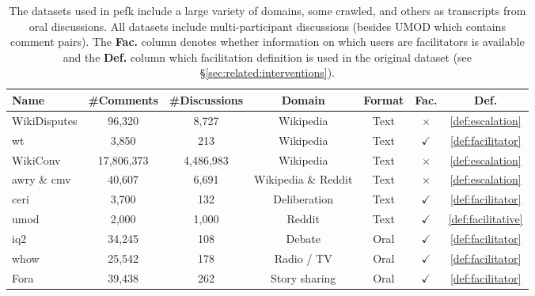 \documentclass[11pt]{article}
\theoremstyle{definition}
\theoremstyle{plain}
\begin{document}
\begin{table}[t]
	\centering
	\small
	\begin{tabularx}{\textwidth}{Xcccccc}
		\toprule
		\textbf{Name} & \textbf{\#Comments} & \textbf{\#Discussions} & \textbf{Domain} & \textbf{Format} & \textbf{Fac.} & \textbf{Def.} \\ \hline
		WikiDisputes \citeyearpar{wikidisputes} & 96,320 & 8,727 & Wikipedia & Text & $\times$ & \ref{def:escalation}\\ 
		\acf{wt} \citeyearpar{wikitactics} & 3,850 & 213 & Wikipedia & Text & $\checkmark$ & \ref{def:facilitator}\\ 
		WikiConv \citeyearpar{wikiconv} & 17,806,373 & 4,486,983 & Wikipedia & Text & $\times$ & \ref{def:escalation}\\ 
		\acf{awry} \& \acf{cmv} \citeyearpar{cmv_awry2} & 40,607 & 6,691 & Wikipedia \& Reddit & Text & $\times$ & \ref{def:escalation}\\
		\acf{ceri} \citeyearpar{ceri} & 3,700 & 132 & Deliberation & Text & $\checkmark$ & \ref{def:facilitator}\\ 
		\acf{umod} \citeyearpar{umod} & 2,000 & 1,000 & Reddit & Text& $\checkmark$ & \ref{def:facilitative}\\ 
		\acf{iq2} \citeyearpar{zhang-etal-2016-conversational} & 34,245 & 108 & Debate & Oral & $\checkmark$ & \ref{def:facilitator}\\ 
		\acf{whow} \citeyearpar{chen-etal-2025-whow} & 25,542 & 178 & Radio / TV & Oral & $\checkmark$ & \ref{def:facilitator}\\ 
		Fora \citeyearpar{schroeder-etal-2024-fora} & 39,438 & 262 & Story sharing & Oral & $\checkmark$ & \ref{def:facilitator}\\ 
		\bottomrule
	\end{tabularx}
	\caption{The datasets used in \acs{pefk} include a large variety of domains, some crawled, and others as transcripts from oral discussions. All datasets include multi-participant discussions (besides UMOD which contains comment pairs). The \textbf{Fac.} column denotes whether information on which users are facilitators is available and the \textbf{Def.} column which facilitation definition is used in the original dataset (see \S\ref{sec:related:interventions}).}
	\label{tab:datasets}
\end{table}
\end{document}
